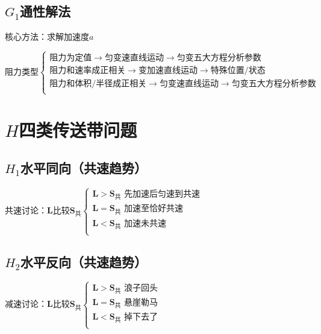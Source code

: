 \documentclass[lang=cn,10pt]{elegantbook}
\begin{document}
         \subsection{$G_{1}$通性解法}
         核心方法：求解加速度$a$
         
         $\text{阻力类型}\begin{cases}
         	\text{阻力为定值}\rightarrow \text{匀变速直线运动}\rightarrow \text{匀变五大方程分析参数}\\
         	\text{阻力和速率成正相关}\rightarrow \text{变加速直线运动}\rightarrow \text{特殊位置}/\text{状态}\\
         	\text{阻力和体积}/\text{半径成正相关}\rightarrow \text{匀变速直线运动}\rightarrow \text{匀变五大方程分析参数}\\
         \end{cases}$
         \vspace{3cm}
         \section{$H$四类传送带问题}
         \subsection{$H_{1}$水平同向（共速趋势）}
         
         共速讨论：$ \boldsymbol{L}\text{比较}\boldsymbol{S}_{\text{共}}\left\{ \begin{array}{c}
         	\boldsymbol{L}>\boldsymbol{S}_{\text{共}}\,\,\text{先加速后匀速到共速}\\
         	\boldsymbol{L}=\boldsymbol{S}_{\text{共}}\,\,\text{加速至恰好共速}\\
         	\boldsymbol{L}<\boldsymbol{S}_{\text{共}}\,\,\text{加速未共速}\\
         \end{array} \right. $
         
          \subsection{$H_{2}$水平反向（共速趋势）}
         
         减速讨论：$\boldsymbol{L}\text{比较}\boldsymbol{S}_{\text{共}}\left\{ \begin{array}{c}
         	\boldsymbol{L}>\boldsymbol{S}_{\text{共}}\,\,\text{浪子回头}\\
         	\boldsymbol{L}=\boldsymbol{S}_{\text{共}}\,\,\text{悬崖勒马}\\
         	\boldsymbol{L}<\boldsymbol{S}_{\text{共}}\,\,\text{掉下去了}\\
         \end{array} \right. $
         
\end{document}
